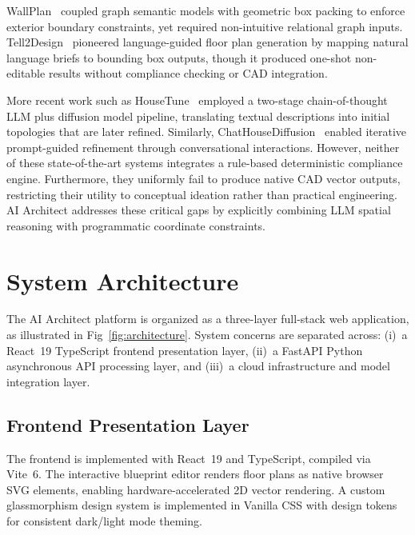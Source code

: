 \documentclass[10pt, twocolumn, letterpaper]{article}
\begin{document}
WallPlan~\cite{wallplan} coupled graph semantic models with geometric box
packing to enforce exterior boundary constraints, yet required non-intuitive
relational graph inputs. Tell2Design~\cite{tell2design} pioneered
language-guided floor plan generation by mapping natural language briefs to
bounding box outputs, though it produced one-shot non-editable results without
compliance checking or CAD integration.

More recent work such as HouseTune~\cite{housetune} employed a two-stage
chain-of-thought LLM plus diffusion model pipeline, translating textual
descriptions into initial topologies that are later refined. Similarly,
ChatHouseDiffusion~\cite{chathousediffusion} enabled iterative prompt-guided
refinement through conversational interactions. However, neither of these
state-of-the-art systems integrates a rule-based deterministic compliance engine.
Furthermore, they uniformly fail to produce native CAD vector outputs,
restricting their utility to conceptual ideation rather than practical engineering.
AI Architect addresses these critical gaps by explicitly combining LLM spatial
reasoning with programmatic coordinate constraints.

\section{System Architecture}

The AI Architect platform is organized as a three-layer full-stack web
application, as illustrated in Fig~\ref{fig:architecture}. System concerns
are separated across: (i)~a React~19 TypeScript frontend presentation layer,
(ii)~a FastAPI Python asynchronous API processing layer, and (iii)~a cloud
infrastructure and model integration layer.

\subsection{Frontend Presentation Layer}

The frontend is implemented with React~19 and TypeScript, compiled via
Vite~6. The interactive blueprint editor renders floor plans as native browser
SVG elements, enabling hardware-accelerated 2D vector rendering. A custom
glassmorphism design system is implemented in Vanilla CSS with design tokens
for consistent dark/light mode theming.
\end{document}
